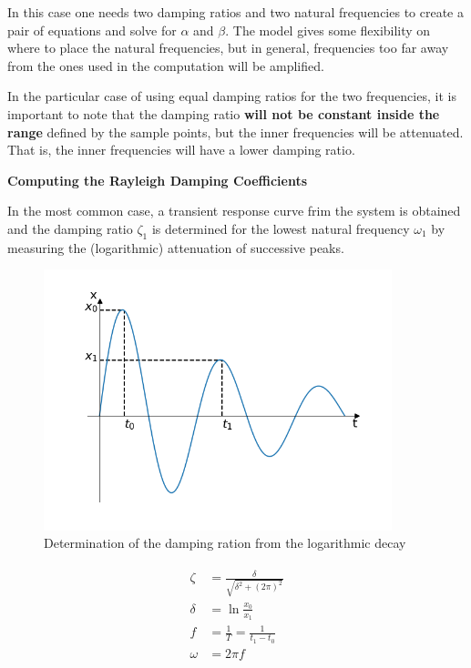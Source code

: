\documentclass[10pt,b5paper,titlepage]{book}
\newenvironment{eqarray}
{
    \begin{eqnarray}
        \begin{aligned}
}
{
        \end{aligned}
    \end{eqnarray}
}
\begin{document}
In this case one needs two damping ratios and two natural frequencies to create
a pair of equations and solve for $ \alpha $ and $ \beta $. The model gives some
flexibility on where to place the natural frequencies, but in general, frequencies
too far away from the ones used in the computation will be amplified.

In the particular case of using equal damping ratios for the two frequencies,
it is important to note that the damping ratio \textbf{will not be constant inside the range}
defined by the sample points, but the inner frequencies will be attenuated. That is,
the inner frequencies will have a lower damping ratio.

\textbf{Computing the Rayleigh Damping Coefficients}

In the most common case, a transient response curve frim the system is obtained and
the damping ratio $ \zeta_1 $ is determined for the lowest natural frequency
$ \omega_1 $ by measuring the (logarithmic) attenuation of successive peaks.

\begin{figure}[ht]
    \centering
    \includegraphics[width=0.90\textwidth]{img/Logarithmic_Decay_Damping_Ratio.png}
    \caption{Determination of the damping ration from the logarithmic decay}
    \label{fig:logarithmic-decay-damping-ratio-png}
\end{figure}

\begin{eqarray}
    \zeta &= \frac{\delta}{\sqrt{\delta^2 + (2 \pi)^2}}\\
    \delta &= \ln{\frac{x_0}{x_1}}\\
    f &= \frac{1}{T} = \frac{1}{t_1 - t_0}\\
    \omega &= 2 \pi f
\end{eqarray}
\end{document}
